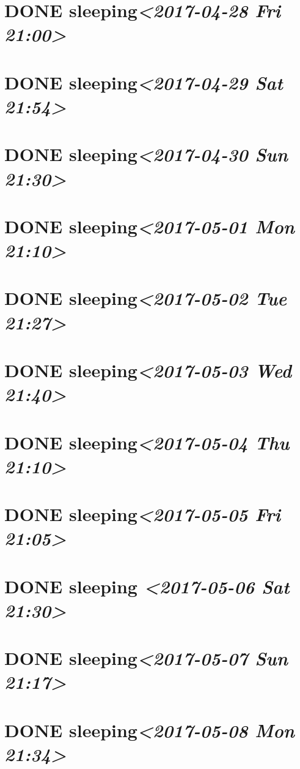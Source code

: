 \documentclass[cyan]{elegantnote}
\begin{document}
\section{{\bfseries\sffamily DONE} sleeping\textit{<2017-04-28 Fri 21:00>}}
\label{sec:org6588c2c}
\section{{\bfseries\sffamily DONE} sleeping\textit{<2017-04-29 Sat 21:54>}}
\label{sec:orgb13dbac}
\section{{\bfseries\sffamily DONE} sleeping\textit{<2017-04-30 Sun 21:30>}}
\label{sec:org7de9f3e}
\section{{\bfseries\sffamily DONE} sleeping\textit{<2017-05-01 Mon 21:10>}}
\label{sec:orgfed9ccf}
\section{{\bfseries\sffamily DONE} sleeping\textit{<2017-05-02 Tue 21:27>}}
\label{sec:org69f1292}
\section{{\bfseries\sffamily DONE} sleeping\textit{<2017-05-03 Wed 21:40>}}
\label{sec:orgd0658a7}
\section{{\bfseries\sffamily DONE} sleeping\textit{<2017-05-04 Thu 21:10>}}
\label{sec:org57b50c8}
\section{{\bfseries\sffamily DONE} sleeping\textit{<2017-05-05 Fri 21:05>}}
\label{sec:org8d18051}
\section{{\bfseries\sffamily DONE} sleeping \textit{<2017-05-06 Sat 21:30>}}
\label{sec:org571f47b}
\section{{\bfseries\sffamily DONE} sleeping\textit{<2017-05-07 Sun 21:17>}}
\label{sec:org10509c2}
\section{{\bfseries\sffamily DONE} sleeping\textit{<2017-05-08 Mon 21:34>}}
\label{sec:org79ed985}
\end{document}
